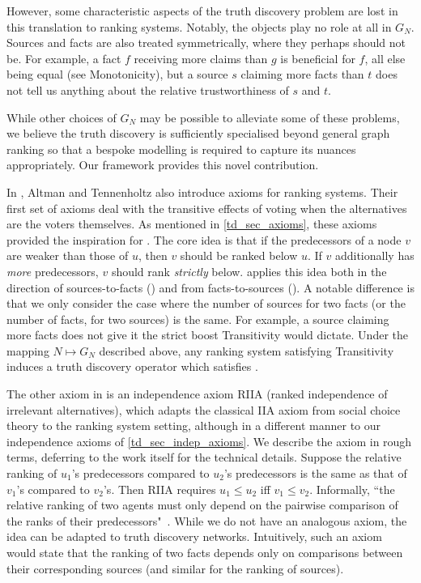 However, some characteristic aspects of the truth discovery problem are lost in
this translation to ranking systems. Notably, the objects play no role at all
in $G_N$. Sources and facts are also treated symmetrically, where they perhaps
should not be. For example, a fact $f$ receiving more claims than $g$ is
beneficial for $f$, all else being equal (see Monotonicity), but a source $s$
claiming more facts than $t$ does not tell us anything about the relative
trustworthiness of $s$ and $t$.

While other choices of $G_N$ may be possible to alleviate some of these
problems, we believe the truth discovery is sufficiently specialised beyond
general graph ranking so that a bespoke modelling is required to capture its
nuances appropriately. Our framework provides this novel contribution.

In \cite{altman2008}, Altman and Tennenholtz also introduce axioms for ranking
systems. Their first set of axioms deal with the transitive effects of voting
when the alternatives are the voters themselves. As mentioned in
\cref{td_sec_axioms}, these axioms provided the inspiration for \coherence{}. The
core idea is that if the predecessors of a node $v$ are weaker than those of
$u$, then $v$ should be ranked below $u$. If $v$ additionally has \emph{more}
predecessors, $v$ should rank \emph{strictly} below. \coherence{} applies this
idea both in the direction of sources-to-facts (\factcoherence{}) and from
facts-to-sources (\sourcecoherence{}). A notable difference is that we only
consider the case where the number of sources for two facts (or the number of
facts, for two sources) is the same. For example, a source claiming more facts
does not give it the strict boost Transitivity would dictate. Under the mapping $N
\mapsto G_N$ described above, any ranking system satisfying Transitivity
induces a truth discovery operator which satisfies \coherence{}.

The other axiom in \cite{altman2008} is an independence axiom RIIA (ranked
independence of irrelevant alternatives), which adapts the classical IIA axiom
from social choice theory to the ranking system setting, although in a
different manner to our independence axioms of \cref{td_sec_indep_axioms}. We
describe the axiom in rough terms, deferring to the work itself for the technical
details. Suppose the relative ranking of $u_1$'s predecessors compared to
$u_2$'s predecessors is the same as that of $v_1$'s compared to $v_2$'s. Then
RIIA requires $u_1 \le u_2$ iff $v_1 \le v_2$. Informally, ``the relative
ranking of two agents must only depend on the pairwise comparison of the ranks
of their predecessors"~\cite{altman2008}.
%
While we do not have an analogous axiom, the idea can be adapted to truth
discovery networks. Intuitively, such an axiom would state that the ranking of
two facts depends only on comparisons between their
corresponding sources (and similar for the ranking of sources).

